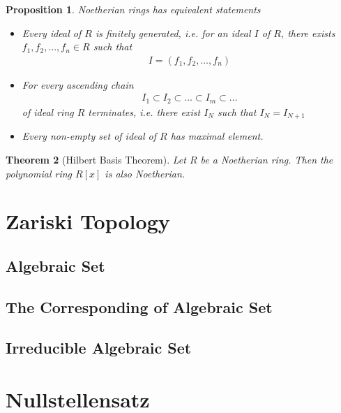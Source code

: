 \documentclass[12pt, a4paper]{article}
\newtheorem{theorem}{Theorem}[section]
\newtheorem{proposition}[theorem]{Proposition}
\theoremstyle{definition}
\begin{document}
    \begin{proposition}
      Noetherian rings has equivalent statements
      
      \begin{itemize}
        \item Every ideal of $R$ is finitely generated, i.e. for an ideal $I$ of $R$, there exists $f_1, f_2, ..., f_n \in R$ such that
        \begin{align*}
          I = (f_1, f_2, \ldots, f_n)
        \end{align*}
        \item For every ascending chain
        \begin{align*}
          I_1 \subset I_2 \subset \ldots \subset I_m \subset \ldots  
        \end{align*}
        of ideal ring $R$ terminates, i.e. there exist $I_N$ such that $I_N = I_{N+1}$  
        \item Every non-empty set of ideal of $R$ has maximal element. 
      \end{itemize}
      
    \end{proposition}

    \begin{theorem}[Hilbert Basis Theorem]
        Let $R$ be a Noetherian ring. Then the polynomial ring $R[x]$ is also Noetherian.
    \end{theorem}


    \section{Zariski Topology}
    \subsection{Algebraic Set}

    \subsection{The Corresponding of Algebraic Set}

    \subsection{Irreducible Algebraic Set}


    \section{Nullstellensatz}
\end{document}
